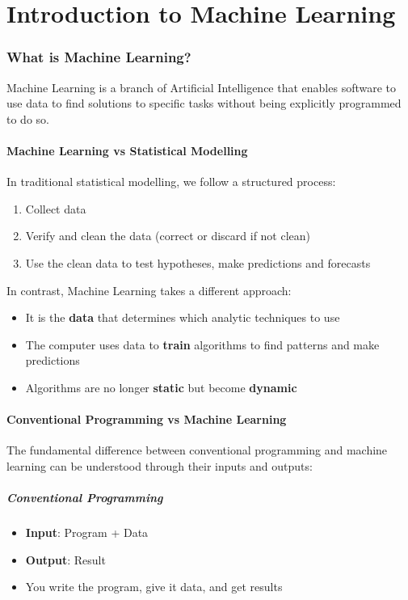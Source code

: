 \documentclass[11pt,a4paper]{article}
\theoremstyle{definition}
\theoremstyle{plain}
\theoremstyle{remark}
\begin{document}
\newpage
\tableofcontents
\newpage

\part{Introduction to Machine Learning}

\section{What is Machine Learning?}

Machine Learning is a branch of Artificial Intelligence that enables software to use data to find solutions to specific tasks without being explicitly programmed to do so.

\subsection{Machine Learning vs Statistical Modelling}

In traditional statistical modelling, we follow a structured process:
\begin{enumerate}
    \item Collect data
    \item Verify and clean the data (correct or discard if not clean)
    \item Use the clean data to test hypotheses, make predictions and forecasts
\end{enumerate}

In contrast, Machine Learning takes a different approach:
\begin{itemize}
    \item It is the \textbf{data} that determines which analytic techniques to use
    \item The computer uses data to \textbf{train} algorithms to find patterns and make predictions
    \item Algorithms are no longer \textbf{static} but become \textbf{dynamic}
\end{itemize}

\subsection{Conventional Programming vs Machine Learning}

The fundamental difference between conventional programming and machine learning can be understood through their inputs and outputs:

\subsubsection{Conventional Programming}
\begin{itemize}
    \item \textbf{Input}: Program + Data
    \item \textbf{Output}: Result
    \item You write the program, give it data, and get results
\end{itemize}
\end{document}
